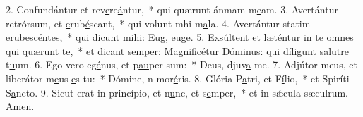 2. Confundántur et rev\uline{e}re\uline{á}ntur,~* qui quærunt ánmam m\uline{e}am.
3. Avertántur retrórsum, et \uline{e}rub\uline{é}scant,~* qui volunt mhi m\uline{a}la.
4. Avertántur statim er\uline{u}besc\uline{é}ntes,~* qui dicunt mihi: Eug, e\uline{u}ge.
5. Exsúltent et læténtur in te \uline{o}mnes qui \uline{quæ}runt te,~* et dicant semper: Magnificétur Dóminus: qui díligunt salutre t\uline{u}um.
6. Ego vero eg\uline{é}nus, et p\uline{au}per sum:~* Deus, djuv\uline{a} me.
7. Adjútor meus, et liberátor m\uline{e}us \uline{e}s tu:~* Dómine, n mor\uline{é}ris.
8. Glória P\uline{a}tri, et F\uline{í}lio,~* et Spiríti S\uline{a}ncto.
9. Sicut erat in princípio, et n\uline{u}nc, et s\uline{e}mper,~* et in sǽcula sæculrum. \uline{A}men.
